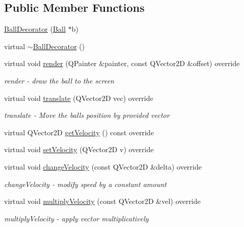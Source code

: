 \subsection*{Public Member Functions}
\begin{DoxyCompactItemize}
\item 
\mbox{\hyperlink{class_ball_decorator_a8ba466927a1d9eb97ee0094a11b5596c}{Ball\+Decorator}} (\mbox{\hyperlink{class_ball}{Ball}} $\ast$b)
\item 
virtual \mbox{\hyperlink{class_ball_decorator_a0bf37b0a36b6db334d7073f01d7ce6e7}{$\sim$\+Ball\+Decorator}} ()
\item 
virtual void \mbox{\hyperlink{class_ball_decorator_af8205f8033b2490ecd3365c24ff5cdeb}{render}} (Q\+Painter \&painter, const Q\+Vector2D \&offset) override
\begin{DoxyCompactList}\small\item\em render -\/ draw the ball to the screen \end{DoxyCompactList}\item 
virtual void \mbox{\hyperlink{class_ball_decorator_aae30ba0b71629db797e0ea2639c5e32d}{translate}} (Q\+Vector2D vec) override
\begin{DoxyCompactList}\small\item\em translate -\/ Move the ball\textquotesingle{}s position by provided vector \end{DoxyCompactList}\item 
virtual Q\+Vector2D \mbox{\hyperlink{class_ball_decorator_aa2123d7419801968b7fce98e546397b7}{get\+Velocity}} () const override
\item 
virtual void \mbox{\hyperlink{class_ball_decorator_aae01d9541d78d1a679ace63127aacd69}{set\+Velocity}} (Q\+Vector2D v) override
\item 
virtual void \mbox{\hyperlink{class_ball_decorator_a3e4f4d31f6409f018b8b337bcf2bd284}{change\+Velocity}} (const Q\+Vector2D \&delta) override
\begin{DoxyCompactList}\small\item\em change\+Velocity -\/ modify speed by a constant amount \end{DoxyCompactList}\item 
virtual void \mbox{\hyperlink{class_ball_decorator_ad1a9139a5c41d17d0eebf007afb984e7}{multiply\+Velocity}} (const Q\+Vector2D \&vel) override
\begin{DoxyCompactList}\small\item\em multiply\+Velocity -\/ apply vector multiplicatively \end{DoxyCompactList}\item 

\end{DoxyCompactItemize}
